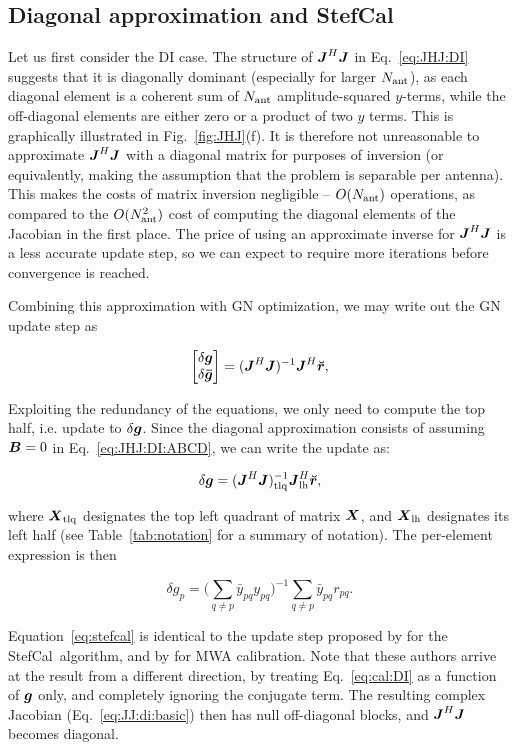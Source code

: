 \documentclass[useAMS,usenatbib]{mn2e}
\newcommand{\vecg}{\bmath{g}}
\newcommand{\vecgc}{\bmath{\bar g}}
\newcommand{\mat}[1]{{\bmath{#1}}}
\newcommand{\JJ}{\mat{J}} %
\newcommand{\JHJ}{\JJ^H\JJ} %
\newcommand{\StefCal}{{\sc StefCal}}
\begin{document}
\subsection{Diagonal approximation and \StefCal}
\label{sec:DI:stefcal}

Let us first consider the DI case. The structure of $\JJ^H\JJ$ in Eq.~\ref{eq:JHJ:DI} suggests that it is diagonally 
dominant (especially for larger $N_\mathrm{ant}$), as each diagonal element is a coherent sum of $N_\mathrm{ant}$ amplitude-squared $y$-terms, 
while the off-diagonal elements are either zero or a product of two $y$ terms. This is graphically illustrated in 
Fig.~\ref{fig:JHJ}(f). It is therefore not unreasonable 
to approximate $\JHJ$ with a diagonal matrix for purposes of inversion (or equivalently, making the assumption that 
the problem is separable per antenna). This makes the costs of matrix inversion negligible -- $O(N_\mathrm{ant})$ operations, as 
compared to the $O(N_\mathrm{ant}^2)$ cost 
of computing the diagonal elements of the Jacobian in the first place. The price of using an approximate inverse for 
$\JHJ$ is a less accurate update step, so we can expect to require more iterations before convergence is reached.

Combining this approximation with GN optimization, we may write out the GN update step as

\[
\Matrix{c}{\delta\vecg \\ \delta\vecgc } = (\JHJ)^{-1} \JJ^H \Rr,
\]

Exploiting the redundancy of the equations, we only need to compute the top half, i.e. update to $\delta\bmath{g}$.
Since the diagonal approximation consists of assuming $\bmath{B}=0$ in Eq.~\ref{eq:JHJ:DI:ABCD}, we can write the 
update as:

\begin{equation}
\label{eq:stefcal-matrix}
\delta \vecg = (\JHJ)_\UL^{-1} \JJ_\LEFT^H \Rr,
\end{equation}

where $\bmath{X}_\UL$ designates the top left quadrant of matrix $\bmath{X}$, and $\bmath{X}_\LEFT$ designates its left half 
(see Table~\ref{tab:notation} for a summary of notation). The per-element expression is then

\begin{equation}
\label{eq:stefcal}
\delta g_p = \big( \sum\limits_{q\ne p} \bar{y}_{pq} y_{pq} \big)^{-1} \sum\limits_{q\ne p} \bar{y}_{pq} r_{pq}.
\end{equation}

Equation~\ref{eq:stefcal} 
is identical to the update step proposed by \citet{Stefcal} for the \StefCal\ algorithm, and by \citet{Mitchell-RTS} for MWA calibration. Note that these authors arrive at the result from a different 
direction, by treating Eq.~\ref{eq:cal:DI} as a function of $\bmath{g}$ only, and completely ignoring the conjugate term. 
The resulting complex Jacobian (Eq.~\ref{eq:JJ:di:basic}) then has null off-diagonal blocks, and $\JJ^H\JJ$ becomes 
diagonal.
\end{document}
